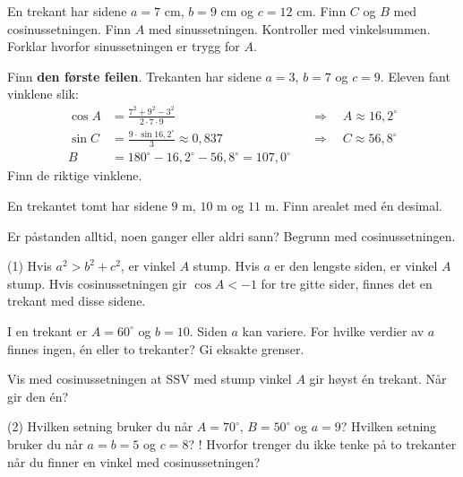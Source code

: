En trekant har sidene $a = 7$ cm, $b = 9$ cm og $c = 12$ cm. Finn $C$ og $B$ med cosinussetningen. Finn $A$ med sinussetningen. Kontroller med vinkelsummen. Forklar hvorfor sinussetningen er trygg for $A$.

Finn \textbf{den første feilen}. Trekanten har sidene $a = 3$, $b = 7$ og $c = 9$. Eleven fant vinklene slik:
\[ \begin{aligned}
\cos A &= \frac{7^2 + 9^2 - 3^2}{2\cdot 7\cdot 9} &&\Rightarrow\quad A \approx 16{,}2^\circ\\[8pt]
\sin C &= \frac{9 \cdot \sin 16{,}2^\circ}{3} \approx 0{,}837 &&\Rightarrow\quad C \approx 56{,}8^\circ\\[8pt]
B &= 180^\circ - 16{,}2^\circ - 56{,}8^\circ = 107{,}0^\circ
\end{aligned} \]
Finn de riktige vinklene.

En trekantet tomt har sidene $9$ m, $10$ m og $11$ m. Finn arealet med én desimal.


Er påstanden alltid, noen ganger eller aldri sann? Begrunn med cosinussetningen.
\begin{tasks}(1)
  \task Hvis $a^2 > b^2 + c^2$, er vinkel $A$ stump.
  \task Hvis $a$ er den lengste siden, er vinkel $A$ stump.
  \task Hvis cosinussetningen gir $\cos A < -1$ for tre gitte sider, finnes det en trekant med disse sidene.
\end{tasks}

I en trekant er $A = 60^\circ$ og $b = 10$. Siden $a$ kan variere. For hvilke verdier av $a$ finnes ingen, én eller to trekanter? Gi eksakte grenser.

Vis med cosinussetningen at SSV med stump vinkel $A$ gir høyst én trekant. Når gir den én?

\begin{sjekk}
\begin{tasks}(2)
  \task Hvilken setning bruker du når $A = 70^\circ$, $B = 50^\circ$ og $a = 9$?
  \task Hvilken setning bruker du når $a = b = 5$ og $c = 8$?
  \task! Hvorfor trenger du ikke tenke på to trekanter når du finner en vinkel med cosinussetningen?
\end{tasks}
\end{sjekk}
